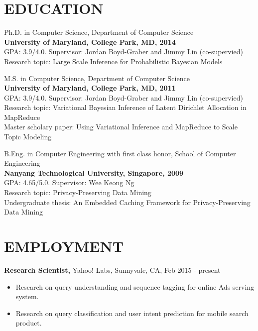 \documentclass{style/resume}
\begin{document}
 
\thispagestyle{empty} %
\address{
  Tel no.: (240) 460-9082\\
  zhaikedavy@gmail.com
}

\begin{resume}
  \vspace{0.1in}

  \section{EDUCATION}
  \vspace{0.1in}

  Ph.D. in Computer Science, Department of Computer Science\\
  {\bf University of Maryland, College Park, MD, 2014}\\
  GPA: 3.9/4.0. Supervisor: Jordan Boyd-Graber and Jimmy Lin (co-supervied)\\
  Research topic: Large Scale Inference for Probabilistic Bayesian Models

  M.S. in Computer Science, Department of Computer Science\\
  {\bf University of Maryland, College Park, MD, 2011}\\
  GPA: 3.9/4.0. Supervisor: Jordan Boyd-Graber and Jimmy Lin (co-supervied)\\
  Research topic: Variational Bayesian Inference of Latent Dirichlet Allocation in MapReduce\\
  Master scholary paper: Using Variational Inference and MapReduce to Scale Topic Modeling

  B.Eng. in Computer Engineering with first class honor, School of Computer Engineering\\
  {\bf Nanyang Technological University, Singapore, 2009}\\
  GPA: 4.65/5.0. Supervisor: Wee Keong Ng\\
  Research topic: Privacy-Preserving Data Mining\\
  Undergraduate thesis: An Embedded Caching Framework for Privacy-Preserving Data Mining

  \section{EMPLOYMENT} 
  \vspace{0.1in}
  {\bf Research Scientist,} Yahoo! Labs, Sunnyvale, CA, Feb 2015 - present
  \begin{itemize}
  \item Research on query understanding and sequence tagging for
    online Ads serving system.
  \item Research on query classification and user intent prediction
    for mobile search product.
  \end{itemize}


\end{resume}
\end{document}
